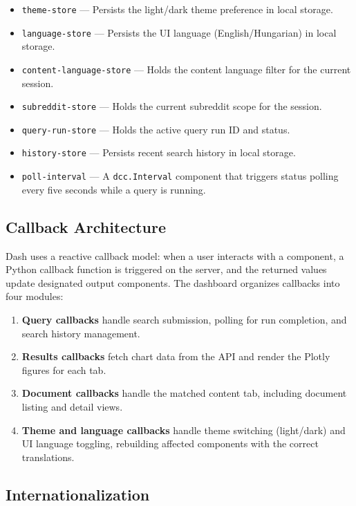\begin{itemize}
    \item \texttt{theme-store} --- Persists the light/dark theme preference in local storage.
    \item \texttt{language-store} --- Persists the UI language (English/Hungarian) in local storage.
    \item \texttt{content-language-store} --- Holds the content language filter for the current session.
    \item \texttt{subreddit-store} --- Holds the current subreddit scope for the session.
    \item \texttt{query-run-store} --- Holds the active query run ID and status.
    \item \texttt{history-store} --- Persists recent search history in local storage.
    \item \texttt{poll-interval} --- A \texttt{dcc.Interval} component that triggers status polling every five seconds while a query is running.
\end{itemize}

\subsection{Callback Architecture}

Dash uses a reactive callback model: when a user interacts with a component, a Python callback function is triggered on the server, and the returned values update designated output components. The dashboard organizes callbacks into four modules:

\begin{enumerate}
    \item \textbf{Query callbacks} handle search submission, polling for run completion, and search history management.
    \item \textbf{Results callbacks} fetch chart data from the API and render the Plotly figures for each tab.
    \item \textbf{Document callbacks} handle the matched content tab, including document listing and detail views.
    \item \textbf{Theme and language callbacks} handle theme switching (light/dark) and UI language toggling, rebuilding affected components with the correct translations.
\end{enumerate}

\subsection{Internationalization}

